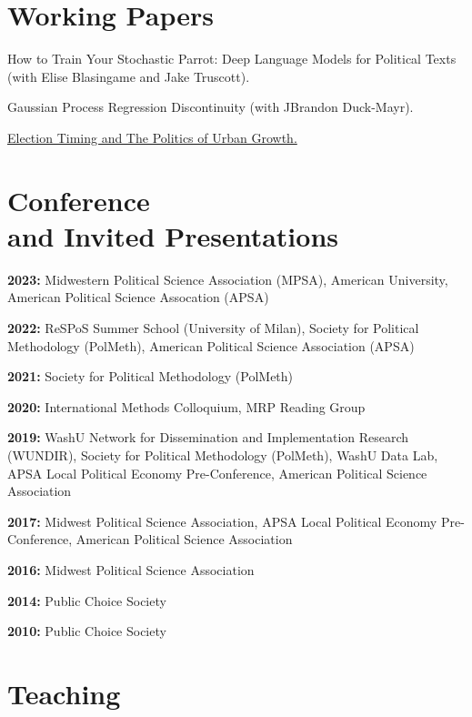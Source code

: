 \documentclass[margin,line]{res}
\newenvironment{publist}{
	\begin{list}{}{%
			\setlength{\itemsep}{0.15in}
			\setlength{\parsep}{0in} \setlength{\parskip}{0in}
			\setlength{\topsep}{0in} \setlength{\partopsep}{0in} 
			\setlength{\leftmargin}{0.15in}
			\setlength{\itemindent}{-0.15in}}}
		{\end{list}}
\begin{document}
\begin{resume}
\section{\sc Working Papers}

\begin{publist}
	
	\item How to Train Your Stochastic Parrot: Deep Language Models for Political Texts (with Elise Blasingame and Jake Truscott).
	
	\item Gaussian Process Regression Discontinuity (with JBrandon Duck-Mayr).
	
	\item \href{https://joeornstein.github.io/publications/Ornstein-ElectionTiming.pdf}{Election Timing and The Politics of Urban Growth.}
\end{publist}

\section{\sc Conference \\and Invited Presentations}

\textbf{2023:} Midwestern Political Science Association (MPSA), American University, American Political Science Assocation (APSA)

\textbf{2022:} ReSPoS Summer School (University of Milan), Society for Political Methodology (PolMeth), American Political Science Association (APSA)

\textbf{2021:} Society for Political Methodology (PolMeth)

\textbf{2020:} International Methods Colloquium, MRP Reading Group

\textbf{2019:} WashU Network for Dissemination and Implementation Research (WUNDIR), Society for Political Methodology (PolMeth), WashU Data Lab, APSA Local Political Economy Pre-Conference, American Political Science Association

\textbf{2017:} Midwest Political Science Association, APSA Local Political Economy Pre-Conference, American Political Science Association

\textbf{2016:} Midwest Political Science Association

\textbf{2014:} Public Choice Society

\textbf{2010:} Public Choice Society


\section{\sc Teaching}



\end{resume}
\end{document}
